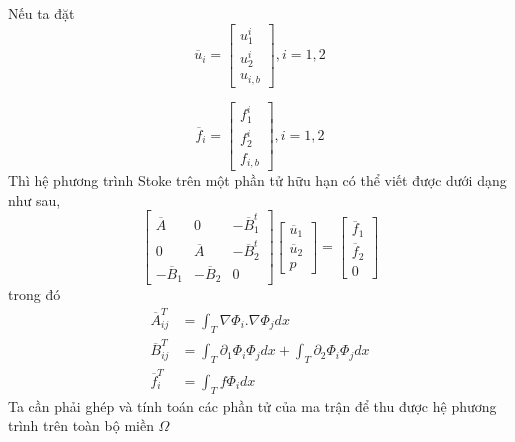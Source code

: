 \documentclass[14pt]{extreport}
\begin{document}
{Nếu ta đặt
\[
\overline{u}_i
=
\begin{bmatrix}
    u_1^i \\
    u_2^i \\
    u_{i, b}
\end{bmatrix}
, i = 1,2
\]

\[
\overline{f}_i
=
\begin{bmatrix}
    f_1^i \\
    f_2^i \\
    f_{i, b}
\end{bmatrix}
, i = 1,2
\]
Thì hệ phương trình Stoke trên một phần tử hữu hạn có thể viết được dưới dạng như sau,
\begin{equation}
  \begin{bmatrix}
    \overline{A} & 0 & -\overline{B}_1^t \\
    0 & \overline{A} & -\overline{B}_2^t \\
    -\overline{B}_1 & -\overline{B}_2 & 0
  \end{bmatrix}
  \begin{bmatrix}
    \overline{u}_1 \\
    \overline{u}_2 \\
    p
  \end{bmatrix}
  =
  \begin{bmatrix}
    \overline{f}_1 \\
    \overline{f}_2 \\
    0
  \end{bmatrix}
  \label{eq18}
\end{equation}
trong đó
\begin{equation} \label{eq19}
\begin{split}
\overline{A}^T_{ij} & = \int_T \nabla \Phi_i . \nabla \Phi_j dx \\
\overline{B}^T_{ij} & = \int_T \partial_1 \Phi_i \Phi_j dx + \int_T \partial_2 \Phi_i \Phi_j dx \\
\overline{f}^T_i & = \int_T f \Phi_i dx
\end{split}
\end{equation}
Ta cần phải ghép và tính toán các phần tử của ma trận để thu được hệ phương trình trên toàn bộ miền $\Omega$
}
\end{document}
